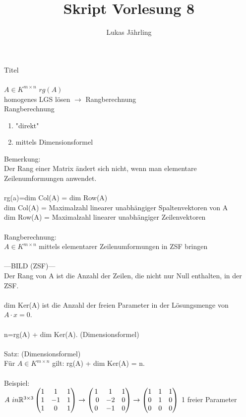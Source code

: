 \documentclass{scrartcl}
\title{Skript Vorlesung 8}
\author{Lukas Jährling}
\begin{document}
	Titel\\\\
	
	$A \in K ^{m \times n}$ \hspace{ 2cm } $rg(A)$\\
	homogenes LGS lösen $\rightarrow$ Rangberechnung\\
	Rangberechnung \begin{enumerate}
		\item 
		"direkt"
		\item
		mittels Dimensionsformel
	\end{enumerate}
	Bemerkung:\\
	Der Rang einer Matrix ändert sich nicht, wenn man elementare Zeilenumformungen anwendet.\\\\
	rg(a)=dim Col(A) = dim Row(A)\\ 
	dim Col(A) = Maximalzahl linearer unabhängiger Spaltenvektoren von A\\
	dim Row(A) = Maximalzahl linearer unabhängiger Zeilenvektoren\\\\
	Rangberechnung:\\
	$A \in K^{m \times n}$ mittels elementarer Zeilenumformungen in ZSF bringen \\\\
	---BILD (ZSF)---\\
	Der Rang von A ist die Anzahl der Zeilen, die nicht nur Null enthalten, in der ZSF.\\\\
	dim Ker(A) ist die Anzahl der freien Parameter in der Lösungsmenge von $A \cdot x = 0$.\\\\
	n=rg(A) + dim Ker(A). (Dimensionsformel)\\\\
	Satz: (Dimensionsformel)\\
	Für $A \in K ^{m \times n}$ gilt: rg(A) + dim Ker(A) = n.\\\\
	Beispiel:\\
	$A \ in \mathbb{R}^{3 \times 3}\\ \begin{pmatrix}
	1 & 1 & 1 \\ 1 & -1 & 1 \\ 1 & 0 & 1
	\end{pmatrix} \rightarrow \begin{pmatrix}
		1 & 1 & 1 \\\ 0 & -2 & 0 \\ 0 & -1 & 0
	\end{pmatrix} \rightarrow \begin{pmatrix}
		1 & 1 & 1 \\ 0 & 1 & 0 \\ 0 & 0 & 0 
	\end{pmatrix}$ \hspace{2cm} 1 freier Parameter\\
\end{document}
